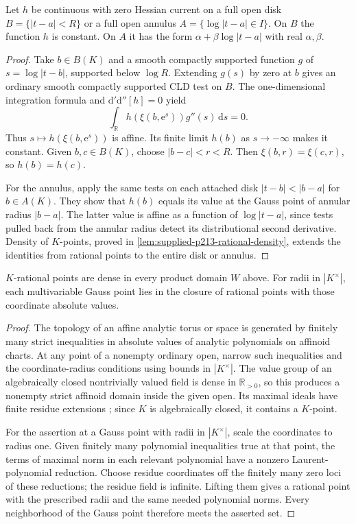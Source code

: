 \begin{lemma}\label{lem:supplied-p213-curve-rigidity}
Let $h$ be continuous with zero Hessian current on a full open disk $B=\{|t-a|<R\}$ or a full open annulus $A=\{\log|t-a|\in I\}$. On $B$ the function $h$ is constant. On $A$ it has the form $\alpha+\beta\log|t-a|$ with real $\alpha,\beta$.
\end{lemma}

\begin{proof}
Take $b\in B(K)$ and a smooth compactly supported function $g$ of $s=\log|t-b|$, supported below $\log R$. Extending $g(s)$ by zero at $b$ gives an ordinary smooth compactly supported CLD test on $B$. The one-dimensional integration formula and $\mathrm d'\mathrm d''[h]=0$ yield
\[
 \int_{\mathbb R}h(\xi(b,\mathrm e^s))g''(s)\,\mathrm ds=0.
\]
Thus $s\mapsto h(\xi(b,\mathrm e^s))$ is affine. Its finite limit $h(b)$ as $s\to-\infty$ makes it constant. Given $b,c\in B(K)$, choose $|b-c|<r<R$. Then $\xi(b,r)=\xi(c,r)$, so $h(b)=h(c)$.

For the annulus, apply the same tests on each attached disk $|t-b|<|b-a|$ for $b\in A(K)$. They show that $h(b)$ equals its value at the Gauss point of annular radius $|b-a|$. The latter value is affine as a function of $\log|t-a|$, since tests pulled back from the annular radius detect its distributional second derivative. Density of $K$-points, proved in \cref{lem:supplied-p213-rational-density}, extends the identities from rational points to the entire disk or annulus.
\end{proof}

\begin{lemma}\label{lem:supplied-p213-rational-density}
$K$-rational points are dense in every product domain $W$ above. For radii in $|K^\times|$, each multivariable Gauss point lies in the closure of rational points with those coordinate absolute values.
\end{lemma}

\begin{proof}
The topology of an affine analytic torus or space is generated by finitely many strict inequalities in absolute values of analytic polynomials on affinoid charts. At any point of a nonempty ordinary open, narrow such inequalities and the coordinate-radius conditions using bounds in $|K^\times|$. The value group of an algebraically closed nontrivially valued field is dense in $\mathbb R_{>0}$, so this produces a nonempty strict affinoid domain inside the given open. Its maximal ideals have finite residue extensions \cite[Corollary~5.19]{JonssonHorawa20}; since $K$ is algebraically closed, it contains a $K$-point.

For the assertion at a Gauss point with radii in $|K^\times|$, scale the coordinates to radius one. Given finitely many polynomial inequalities true at that point, the terms of maximal norm in each relevant polynomial have a nonzero Laurent-polynomial reduction. Choose residue coordinates off the finitely many zero loci of these reductions; the residue field is infinite. Lifting them gives a rational point with the prescribed radii and the same needed polynomial norms. Every neighborhood of the Gauss point therefore meets the asserted set.
\end{proof}

